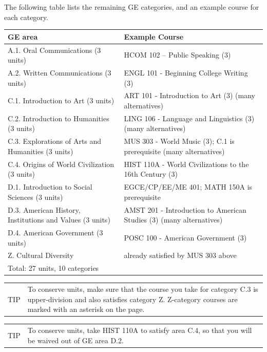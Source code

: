 \documentclass{book}
\newenvironment{tip}
               {\tcolorbox \begin{tabular}{m{.5in} m{5in}} \Large{TIP} & }
               {\end{tabular} \endtcolorbox}
\begin{document}
The following table lists the remaining GE categories, and an example course for each category.

\begin{center}
\begin{tabular}{| p{3in} | p{3in} |} \hline
  \textbf{GE area} & \textbf{Example Course} \\ \hline
  A.1. Oral Communications (3 units) & HCOM 102 – Public Speaking (3) \\ \hline
  A.2. Written Communications (3 units) & ENGL 101 - Beginning College Writing (3) \\ \hline
  C.1. Introduction to Art (3 units) & ART 101 - Introduction to Art (3) (many alternatives) \\ \hline
  C.2. Introduction to Humanities (3 units) & LING 106 - Language and Linguistics (3) (many alternatives) \\ \hline
  C.3. Explorations of Arts and Humanities (3 units) & MUS 303 - World Music (3); C.1 is prerequisite (many alternatives) \\ \hline
  C.4. Origins of World Civilization (3 units) & HIST 110A - World Civilizations to the 16th Century (3) \\ \hline
  D.1. Introduction to Social Sciences (3 units) & EGCE/CP/EE/ME 401; MATH 150A is prerequisite \\ \hline
  D.3. American History, Institutions and Values (3 units) & AMST 201 - Introduction to American Studies (3) (many alternatives) \\ \hline
  D.4. American Government (3 units) & POSC 100 - American Government (3) \\ \hline
  Z. Cultural Diversity & already satisfied by MUS 303 above \\ \hline
  \multicolumn{2}{|l|}{Total: 27 units, 10 categories} \\ \hline
\end{tabular}
\end{center}

\begin{tip}
To conserve units, make sure that the course you take for category C.3 is upper-division and also satisfies category Z. Z-category courses are marked with an asterisk on the \gecourselist page.
\end{tip}

\begin{tip}
  To conserve units, take HIST 110A to satisfy area C.4, so that you will be waived out of GE area D.2.
  \end{tip}
\end{document}
